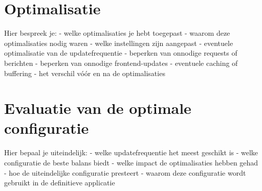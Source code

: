 \section{Optimalisatie}
Hier bespreek je:
- welke optimalisaties je hebt toegepast
- waarom deze optimalisaties nodig waren
- welke instellingen zijn aangepast
- eventuele optimalisatie van de updatefrequentie
- beperken van onnodige requests of berichten
- beperken van onnodige frontend-updates
- eventuele caching of buffering
- het verschil vóór en na de optimalisaties

\section{Evaluatie van de optimale configuratie}
Hier bepaal je uiteindelijk:
- welke updatefrequentie het meest geschikt is
- welke configuratie de beste balans biedt
- welke impact de optimalisaties hebben gehad
- hoe de uiteindelijke configuratie presteert
- waarom deze configuratie wordt gebruikt in de definitieve applicatie